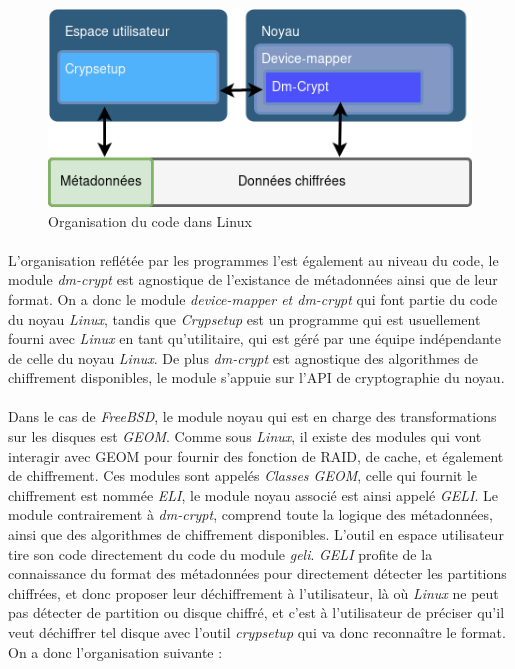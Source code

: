 \paragraph{}
\begin{figure}[h]
\centering
\includegraphics[width=.8\linewidth]{etat_art/organisation_linux.png}
\caption{\label{fig:OrgLinux}Organisation du code dans Linux}
\end{figure}

\paragraph{}
L'organisation reflétée par les programmes l'est également au niveau du code,
le module {\em dm-crypt} est agnostique de l'existance de métadonnées ainsi 
que de leur format. On a donc le module {\em device-mapper \em et \em dm-crypt}
qui font partie du code du noyau {\em Linux}, tandis que {\em Crypsetup} est un 
programme qui est usuellement fourni avec {\em Linux} en tant qu'utilitaire, 
qui est géré par une équipe indépendante de celle du noyau {\em Linux}. De plus 
{\em dm-crypt} est agnostique des algorithmes de chiffrement disponibles,
le module s'appuie sur l'API de cryptographie du noyau.

\paragraph{}
Dans le cas de {\em FreeBSD}, le module noyau qui est en charge des
transformations sur les disques est {\em GEOM}. Comme sous {\em Linux}, 
il existe des modules qui vont interagir avec GEOM pour fournir des fonction 
de RAID, de cache, et également de chiffrement. 
Ces modules sont appelés {\em Classes GEOM}, 
celle qui fournit le chiffrement est nommée {\em ELI}, le module noyau associé 
est ainsi appelé {\em GELI}. Le module contrairement à {\em dm-crypt}, 
comprend toute la logique des métadonnées, ainsi que des algorithmes de 
chiffrement disponibles. L'outil en espace utilisateur tire son code
directement du code du module {\em geli}. {\em GELI} profite de la 
connaissance du format des métadonnées pour directement détecter les 
partitions chiffrées, et donc proposer leur déchiffrement à l'utilisateur, 
là où {\em Linux} ne peut pas détecter de
partition ou disque chiffré, et c'est à l'utilisateur de préciser qu'il veut 
déchiffrer tel disque avec l'outil {\em crypsetup} qui va donc reconnaître le 
format. On a donc l'organisation suivante :


